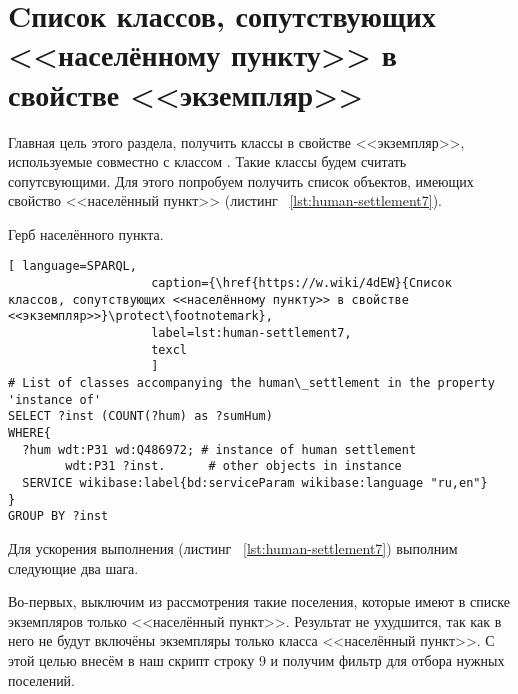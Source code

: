 \section{Cписок классов, сопутствующих <<населённому пункту>> в свойстве <<экземпляр>>}
\label{human-settlement:tag1}

Главная цель этого раздела, получить классы в свойстве <<экземпляр>>, используемые совместно с классом . Такие классы будем считать сопутсвующими. Для этого попробуем получить список объектов, имеющих свойство <<населённый пункт>> (листинг ~\protect\ref{lst:human-settlement7}).

\begin{marginfigure}[0.0cm]
{
\setlength{\fboxsep}{0pt}%
\setlength{\fboxrule}{1pt}%
%
}
  \caption{Герб населённого пункта.}%
  \label{fig:flag_question_human_settlements5}%
\end{marginfigure}


\begin{lstlisting}[ language=SPARQL, 
                    caption={\href{https://w.wiki/4dEW}{Cписок классов, сопутствующих <<населённому пункту>> в свойстве <<экземпляр>>}\protect\footnotemark},
                    label=lst:human-settlement7,
                    texcl 
                    ]
# List of classes accompanying the human\_settlement in the property 'instance of'
SELECT ?inst (COUNT(?hum) as ?sumHum) 
WHERE{          
  ?hum wdt:P31 wd:Q486972; # instance of human settlement
        wdt:P31 ?inst.      # other objects in instance
  SERVICE wikibase:label{bd:serviceParam wikibase:language "ru,en"}
}  
GROUP BY ?inst
\end{lstlisting}%

Для ускорения выполнения (листинг ~\protect\ref{lst:human-settlement7}) выполним следующие два шага.
 
Во-первых, выключим из рассмотрения такие поселения, которые имеют в списке экземпляров только <<населённый пункт>>. Результат не ухудшится, так как в него не будут включёны экземпляры только класса <<населённый пункт>>. С этой целью внесём в наш скрипт строку \num{9} и получим фильтр для отбора нужных поселений.

